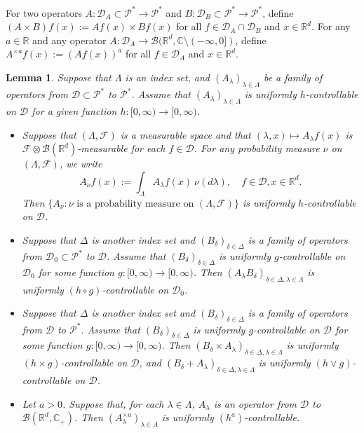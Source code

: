 \documentclass[12pt,a4paper]{amsart}
\theoremstyle{plain}
\newtheorem{lem}[thm]{Lemma}
\theoremstyle{definition}
\numberwithin{equation}{section}
\begin{document}
    For two operators $A: \mathcal D_A \subset \mathcal P^*\to \mathcal P^*$ and $B: \mathcal D_B \subset \mathcal P^*\to \mathcal P^*$, define $(A \times B)f (x):= Af(x) \times Bf(x)$ for all $f\in \mathcal D_A \cap \mathcal D_B$ and $x\in \mathbb{R}^d$.
    For any $a \in \mathbb R$ and any operator $A :\mathcal D_A \to \mathcal B(\mathbb R^d, \mathbb C\setminus (-\infty, 0])$, define $A^{\times a}f(x):= (Af(x))^a$ for all $f\in \mathcal D_A$ and $x\in \mathbb R^d$.
\begin{lem}\label{lem: property of controllable operators}
    Suppose that $\Lambda$ is an index set, and $(A_\lambda)_{\lambda\in \Lambda}$ be a family of operators from $\mathcal D\subset \mathcal P^*$ to $ \mathcal P^*$. 
    Assume that $(A_\lambda)_{\lambda\in \Lambda}$ is uniformly $h$-controllable on $\mathcal D$ for a given function $h:[0,\infty) \to [0, \infty)$.
\begin{itemize}
\item[(1)]
    Suppose that $(\Lambda, \mathscr F)$ is a measurable space and that $(\lambda,x)\mapsto A_\lambda f(x)$ is $\mathscr F \otimes \mathscr B(\mathbb R^d)$-measurable for each $f\in \mathcal D$.
    For any probability measure $\nu$ on $(\Lambda, \mathscr F)$,  we write
\[
    A_\nu f(x)
    := \int_{\Lambda} A_\lambda f (x)~\nu(d\lambda), 
    \quad f\in \mathcal D, x\in \mathbb R^d.
\]
    Then  $\{A_\nu: \nu \text{ is  a probability measure on } (\Lambda, \mathscr F)\}$ is uniformly $h$-controllable on $\mathcal D$.
\item[(2)]
    Suppose that $\Delta$ is another index set and $(B_\delta)_{\delta\in \Delta}$ is a family of operators from $\mathcal D_0\subset \mathcal P^*$ to $ \mathcal D$.
    Assume that $(B_\delta)_{\delta\in \Delta}$ is uniformly $g$-controllable on $\mathcal D_0$ for some function $g: [0,\infty) \to [0,\infty)$.
    Then $(A_\lambda B_\delta)_{\delta\in \Delta, \lambda \in \Lambda}$ is uniformly $(h \circ g)$-controllable on $\mathcal D_0$.
\item[(3)]
    Suppose that $\Delta$ is another index set and $(B_\delta)_{\delta\in \Delta}$ is a family of operators from $\mathcal D$ to $ \mathcal P^*$.
    Assume that $(B_\delta)_{\delta\in \Delta}$ is uniformly $g$-controllable on $\mathcal D$ for some function $g: [0,\infty) \to [0,\infty)$.
    Then  $(B_\delta\times A_\lambda)_{\delta \in \Delta, \lambda \in \Lambda}$ is uniformly $(h\times g)$-controllable on $\mathcal D$, and $(B_\delta + A_\lambda)_{\delta \in \Delta, \lambda \in \Lambda}$ is uniformly $(h\vee g)$-controllable on $\mathcal D$.
\item[(4)]
    Let $a>0$. 
    Suppose that, for each $\lambda \in \Lambda$, $A_\lambda$ is an operator from $\mathcal D$ to $\mathcal B(\mathbb R^d, \mathbb C_+)$.
    Then $(A^{\times a}_\lambda)_{\lambda \in \Lambda}$ is uniformly $(h^a)$-controllable.
\end{itemize}
\end{lem}
\end{document}
